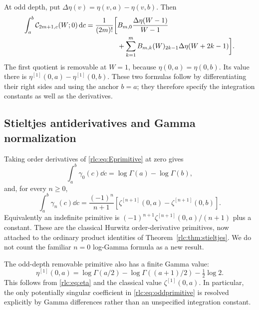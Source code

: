 At odd depth, put $\Delta\eta(v)=\eta(v,a)-\eta(v,b)$. Then
\begin{align}
 \int_a^b\mathcal C_{2m+1,c}(W;0)\,\mathrm d c
 =\frac1{(2m)!}\biggl[&B_{m,0}\frac{\Delta\eta(W-1)}{W-1}\notag\\
 &+\sum_{k=1}^{m}B_{m,k}(W)_{2k-1}
                          \Delta\eta(W+2k-1)\biggr].
 \label{rlc:eq:oddprimitive}
\end{align}
The first quotient is removable at $W=1$, because $\eta(0,a)=\eta(0,b)$.
Its value there is $\eta^{[1]}(0,a)-\eta^{[1]}(0,b)$.
These two formulas follow by differentiating their right sides and using
the anchor $b=a$; they therefore specify the integration constants as
well as the derivatives.

\subsection{Stieltjes antiderivatives and Gamma normalization}
Taking order derivatives of \eqref{rlc:eq:Eprimitive} at zero gives
\begin{equation}\label{rlc:eq:gammaprimitive}
 \int_a^b\gamma_0(c)\dd c=\log\Gamma(a)-\log\Gamma(b),
\end{equation}
and, for every $n\ge0$,
\begin{equation}\label{rlc:eq:stieltjesprimitive}
 \boxed{\displaystyle
 \int_a^b\gamma_n(c)\dd c
 =\frac{(-1)^n}{n+1}
       [\zeta^{[n+1]}(0,a)-\zeta^{[n+1]}(0,b)].}
\end{equation}
Equivalently an indefinite primitive is
$(-1)^{n+1}\zeta^{[n+1]}(0,a)/(n+1)$ plus a constant.
These are the classical Hurwitz order-derivative primitives, now attached
to the ordinary product identities of Theorem~\ref{rlc:thm:stieltjes}.
We do not count the familiar $n=0$ log-Gamma formula as a new result.

The odd-depth removable primitive also has a finite Gamma value:
\[
 \eta^{[1]}(0,a)=\log\Gamma(a/2)-\log\Gamma((a+1)/2)
                         -\tfrac12\log2.
\]
This follows from \eqref{rlc:eq:eta} and the classical value
$\zeta^{[1]}(0,a)$. In particular, the only potentially singular
coefficient in \eqref{rlc:eq:oddprimitive} is resolved explicitly by
Gamma differences rather than an unspecified integration constant.

